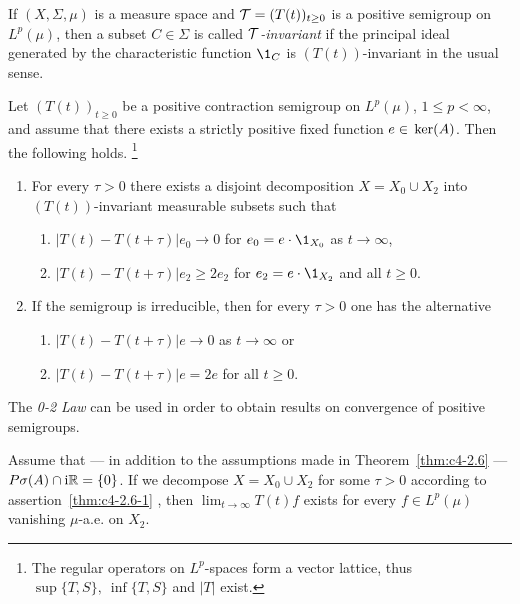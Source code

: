 If\/ $(X, \Sigma, \mu)$ is a measure space and $\TT = (T(t))_{t \geq 0}$ is a positive semigroup on $L^{p}(\mu)$, then a subset $C \in \Sigma$ is called \emph{$\mathcal{T}$-invariant} if the principal ideal generated by the characteristic function $\1_{C}$ is $(T(t))$-invariant in the usual sense.
\begin{theorem}\label{thm:c4-2.6}
%
%
Let $(T(t))_{t \geq 0}$ be a positive contraction semigroup on $L^{p}(\mu)$, $1 \leq p < \infty$, and assume that there exists a strictly positive fixed function $e \in \mathop{}\mathrm{ker}(A)$. 
Then the following holds. 
\footnote{The regular operators on $L^p$-spaces form a vector lattice, thus $\sup\{T,S\},\ \inf\{T,S\}$ and $|T|$ exist.}
\begin{enumerate}[\upshape (i)]
\item \label{thm:c4-2.6-1}
For every $\tau > 0$ there exists a disjoint decomposition $X = X_{0} \cup X_{2}$ into $(T(t))$-invariant measurable subsets such that
\begin{enumerate}
    \item[(0)] \label{thm:c4-2.6-1.1} 
    $|T(t) - T(t+\tau)|e_{0} \to 0$ for $e_{0} = e \cdot \1_{X_{0}}$ as $t \to \infty$,
    \item[(2)] \label{thm:c4-2.6-1.2} 
    $|T(t) - T(t+\tau)|e_{2} \geq 2e_{2}$ for $e_{2} = e \cdot \1_{X_{2}}$ and all $t \geq 0$.
    \end{enumerate}

\item \label{thm:c4-2.6-2} 
If the semigroup is irreducible, then for every $\tau > 0$ one has the alternative
\begin{enumerate}
    \item[(0)] \label{thm:c4-2.6-2.1} 
    $|T(t) - T(t+\tau)|e \to 0$ as $t \to \infty$ or
    \item[(2)] \label{thm:c4-2.6-2.2} 
    $|T(t) - T(t+\tau)|e = 2e$ for all $t \geq 0$.
\end{enumerate}
\end{enumerate}
\end{theorem}
The \emph{0-2 Law} can be used in order to obtain results on convergence of positive semigroups.
\begin{corollary}\label{cor:c4-2.7}
%
Assume that --- in addition to the assumptions made in Theorem~\ref{thm:c4-2.6} --- $P{\sigma}(A) \cap \mathrm{i}\mathbb{R} = \{0\}$.
If we decompose $X = X_{0} \cup X_{2}$ for some $\tau > 0$ according to assertion~\ref{thm:c4-2.6-1} , then $\lim_{t \to \infty} T(t)f$ exists for every $f \in L^{p}(\mu)$ vanishing $\mu$-a.e. on $X_{2}$.
\end{corollary}
